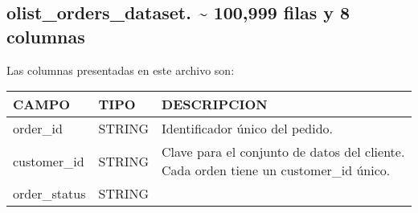 \documentclass[11pt]{article}
\begin{document}
    \hypertarget{olist_orders_dataset.-100999-filas-y-8-columnas}{%
\subsection{olist\_orders\_dataset. \textasciitilde{} 100,999 filas y 8
columnas}\label{olist_orders_dataset.-100999-filas-y-8-columnas}}

Las columnas presentadas en este archivo son:

\begin{longtable}[]{@{}lll@{}}
\toprule
\begin{minipage}[b]{0.30\columnwidth}\raggedright
CAMPO\strut
\end{minipage} & \begin{minipage}[b]{0.30\columnwidth}\raggedright
TIPO\strut
\end{minipage} & \begin{minipage}[b]{0.30\columnwidth}\raggedright
DESCRIPCION\strut
\end{minipage}\tabularnewline
\midrule
\endhead
\begin{minipage}[t]{0.30\columnwidth}\raggedright
order\_id\strut
\end{minipage} & \begin{minipage}[t]{0.30\columnwidth}\raggedright
STRING\strut
\end{minipage} & \begin{minipage}[t]{0.30\columnwidth}\raggedright
Identificador único del pedido.\strut
\end{minipage}\tabularnewline
\begin{minipage}[t]{0.30\columnwidth}\raggedright
customer\_id\strut
\end{minipage} & \begin{minipage}[t]{0.30\columnwidth}\raggedright
STRING\strut
\end{minipage} & \begin{minipage}[t]{0.30\columnwidth}\raggedright
Clave para el conjunto de datos del cliente. Cada orden tiene un
customer\_id único.\strut
\end{minipage}\tabularnewline
\begin{minipage}[t]{0.30\columnwidth}\raggedright
order\_status\strut
\end{minipage} & \begin{minipage}[t]{0.30\columnwidth}\raggedright
STRING\strut
\end{minipage} & \begin{minipage}[t]{0.30\columnwidth}\raggedright

\end{minipage}
\end{longtable}
\end{document}
